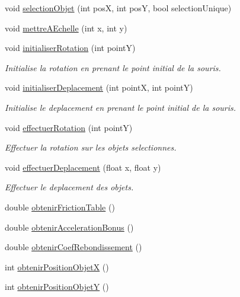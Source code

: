 \begin{DoxyCompactItemize}
\item 
void \hyperlink{group__inf2990_ga2b89ce775f045c41e61081d6271eaf1e}{selection\+Objet} (int posX, int posY, bool selection\+Unique)
\item 
void \hyperlink{group__inf2990_gaffcf7c590a0ae08d5b018d646b6e6b9d}{mettre\+A\+Echelle} (int x, int y)
\item 
void \hyperlink{group__inf2990_gae4dafde19e9c66c81a2937af9884a987}{initialiser\+Rotation} (int pointY)
\begin{DoxyCompactList}\small\item\em Initialise la rotation en prenant le point initial de la souris. \end{DoxyCompactList}\item 
void \hyperlink{group__inf2990_gaa11820c8cd950a8aa4bab5c8a5cffae2}{initialiser\+Deplacement} (int pointX, int pointY)
\begin{DoxyCompactList}\small\item\em Initialise le deplacement en prenant le point initial de la souris. \end{DoxyCompactList}\item 
void \hyperlink{group__inf2990_ga3df43140795a4426e4408e968a21f22f}{effectuer\+Rotation} (int pointY)
\begin{DoxyCompactList}\small\item\em Effectuer la rotation sur les objets selectionnes. \end{DoxyCompactList}\item 
void \hyperlink{group__inf2990_ga3674bdc526c4046c7a53393fa0183d1c}{effectuer\+Deplacement} (float x, float y)
\begin{DoxyCompactList}\small\item\em Effectuer le deplacement des objets. \end{DoxyCompactList}\item 
double \hyperlink{group__inf2990_gad132f27b4e86f25aef4d8b9ad93fe210}{obtenir\+Friction\+Table} ()
\item 
double \hyperlink{group__inf2990_ga2f768cce7db86eba06e1e448a4efa2f2}{obtenir\+Acceleration\+Bonus} ()
\item 
double \hyperlink{group__inf2990_ga1376bb78e311e9c724cd87d454a385b6}{obtenir\+Coef\+Rebondissement} ()
\item 
int \hyperlink{group__inf2990_gae6d3005130428ead82d1dfbcab7332ca}{obtenir\+Position\+ObjetX} ()
\item 
int \hyperlink{group__inf2990_ga9cebbfb71c3263597c8f0ddfb0bf78bd}{obtenir\+Position\+ObjetY} ()

\end{DoxyCompactItemize}
